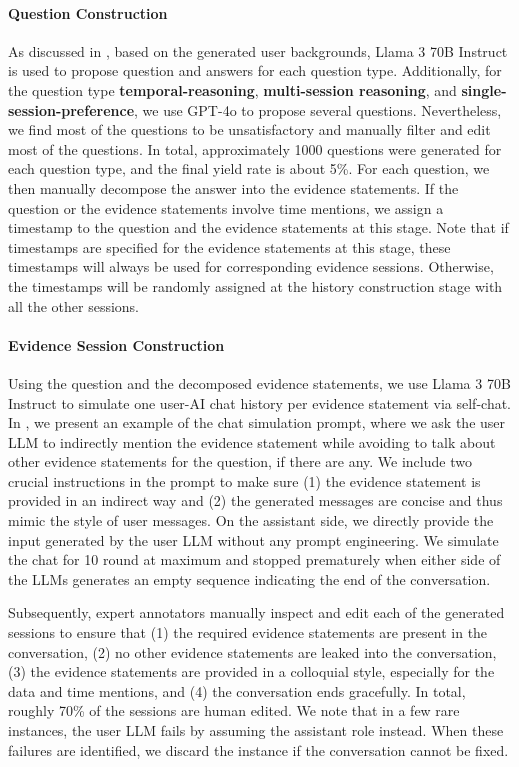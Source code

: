 \paragraph{Question Construction} As discussed in , based on the generated user backgrounds, Llama 3 70B Instruct is used to propose question and answers for each question type. Additionally, for the question type \textbf{temporal-reasoning}, \textbf{multi-session reasoning}, and \textbf{single-session-preference}, we use GPT-4o to propose several questions. Nevertheless, we find most of the questions to be unsatisfactory and manually filter and edit most of the questions. In total, approximately 1000 questions were generated for each question type, and the final yield rate is about 5\%. For each question, we then manually decompose the answer into the evidence statements. If the question or the evidence statements involve time mentions, we assign a timestamp to the question and the evidence statements at this stage. Note that if timestamps are specified for the evidence statements at this stage, these timestamps will always be used for corresponding evidence sessions. Otherwise, the timestamps will be randomly assigned at the history construction stage with all the other sessions. 



\paragraph{Evidence Session Construction} Using the question and the decomposed evidence statements, we use Llama 3 70B Instruct to simulate one user-AI chat history per evidence statement via self-chat. In , we present an example of the chat simulation prompt, where we ask the user LLM to indirectly mention the evidence statement while avoiding to talk about other evidence statements for the question, if there are any. We include two crucial instructions in the prompt to make sure (1) the evidence statement is provided in an indirect way and (2) the generated messages are concise and thus mimic the style of user messages. On the assistant side, we directly provide the input generated by the user LLM without any prompt engineering. We simulate the chat for 10 round at maximum and stopped prematurely when either side of the LLMs generates an empty sequence indicating the end of the conversation. 

Subsequently, expert annotators manually inspect and edit each of the generated sessions to ensure that (1) the required evidence statements are present in the conversation, (2) no other evidence statements are leaked into the conversation, (3) the evidence statements are provided in a colloquial style, especially for the data and time mentions, and (4) the conversation ends gracefully. In total, roughly 70\% of the sessions are human edited. We note that in a few rare instances, the user LLM fails by assuming the assistant role instead. When these failures are identified, we discard the instance if the conversation cannot be fixed.


